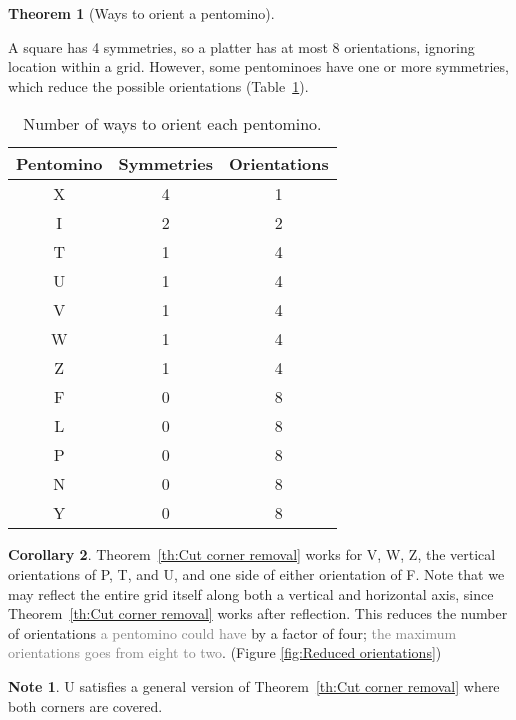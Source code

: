\documentclass{article}
\theoremstyle{definition}%
\newtheorem{theorem}{Theorem}[section]
\newtheorem{corollary}[theorem]{Corollary}%
\newtheorem*{note}{Note}
\newcommand{\minordetail}[1]{\textcolor{gray}{#1}}
\begin{document}
\begin{theorem}[Ways to orient a pentomino]
\label{th:Pentomino orientations}

A square has 4 symmetries, so a platter has at most 8 orientations, ignoring location within a grid. However, some pentominoes have one or more symmetries, which reduce the possible orientations (Table~\ref{tab:pentomino orientations}).

    \begin{table}[htbp]
        \centering
        \caption{Number of ways to orient each pentomino. \cite[0:41]{v1}}
        \begin{tabular}{ccc}
            \toprule
            Pentomino & Symmetries & Orientations \\
            \midrule
            X & 4 & 1 \\
            I & 2 & 2 \\
            T & 1 & 4 \\
            U & 1 & 4 \\
            V & 1 & 4 \\
            W & 1 & 4 \\
            Z & 1 & 4 \\
            F & 0 & 8 \\
            L & 0 & 8 \\
            P & 0 & 8 \\
            N & 0 & 8 \\
            Y & 0 & 8 \\
            \bottomrule
        \end{tabular}
        \label{tab:pentomino orientations}
    \end{table}
\end{theorem}

\begin{corollary}
Theorem~\ref{th:Cut corner removal} works for V, W, Z, the vertical orientations of P, T, and U, and one side of either orientation of F. Note that we may reflect the entire grid itself along both a vertical and horizontal axis, since Theorem~\ref{th:Cut corner removal} works after reflection. This reduces the number of orientations \minordetail{a pentomino could have} by a factor of four; \minordetail{the maximum orientations goes from eight to two}. (Figure \ref{fig:Reduced orientations})
\end{corollary}

\begin{note}
U satisfies a general version of Theorem~\ref{th:Cut corner removal} where both corners are covered.
\end{note}
\end{document}
